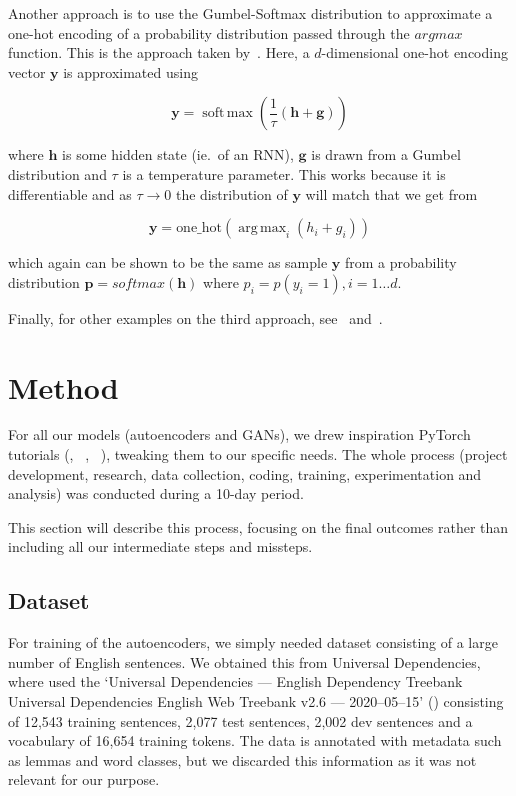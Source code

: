 \documentclass{article}
\DeclareMathOperator*{\argmax}{arg\,max}
\DeclareMathOperator*{\softmax}{soft\,max}
\begin{document}
Another approach is to use the Gumbel-Softmax distribution to approximate a
one-hot encoding of a probability distribution passed through the $argmax$
function. This is the approach taken by~\cite{kusner2016gans}. Here, a
$d$-dimensional one-hot encoding vector $\bm{y}$ is approximated using

\begin{equation}
    \bm{y} = \softmax(\frac{1}{\tau}(\bm{h}+\bm{g}))
\end{equation}

where $\bm{h}$ is some hidden state (ie.\ of an RNN), $\bm{g}$ is drawn from a
Gumbel distribution and $\tau$ is a temperature parameter. This works because it
is differentiable and as $\tau \to 0$ the distribution of $\bm{y}$ will match
that we get from

\begin{equation}
    \bm{y} = \text{one\_hot}(\argmax_{i}(h_i + g_i))
\end{equation}

which again can be shown to be the same as sample $\bm{y}$ from a probability
distribution $\bm{p} = softmax(\bm{h})$ where $p_i = p(y_i=1), i = 1\dots d$.

Finally, for other examples on the third approach,
see~\cite{donahue2018adversarial} and~\cite{haidar2019textkdgan}.


\section{Method}\label{sec:method}

For all our models (autoencoders and GANs), we drew inspiration PyTorch
tutorials
(\cite{pytorchTutorialAtt}, ~\cite{pytorchTutorialTransformer}, ~\cite{pytorchTutorialGAN}),
tweaking them to our specific needs. The whole process (project development,
research, data collection, coding, training, experimentation and analysis) was
conducted during a 10-day period.

This section will describe this process, focusing on the final outcomes rather
than including all our intermediate steps and missteps.

\subsection{Dataset}\label{sec:dataset}

For training of the autoencoders, we simply needed dataset consisting of a large
number of English sentences. We obtained this from Universal Dependencies, where
used the `Universal Dependencies --- English Dependency Treebank Universal
Dependencies English Web Treebank v2.6 --- 2020--05--15' (\cite{silveira14gold})
consisting of 12,543 training sentences, 2,077 test sentences, 2,002 dev
sentences and a vocabulary of 16,654 training tokens. The data is annotated with
metadata such as lemmas and word classes, but we discarded this information as
it was not relevant for our purpose.
\end{document}
